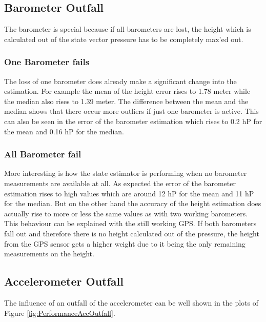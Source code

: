 \subsection{Barometer Outfall}
The barometer is special because if all barometers are lost,
the height which is calculated out of the state vector pressure has to be completely max'ed out.

\subsubsection{One Barometer fails}
The loss of one barometer does already make a significant change into the estimation.
For example the mean of the height error rises to 1.78 meter while the median also rises to 1.39 meter.
The difference between the mean and the median shows that there occur more outliers if just one barometer is active.
This can also be seen in the error of the barometer estimation which rises to 0.2 hP for the mean and 0.16 hP for the median.

\subsubsection{All Barometer fail}
More interesting is how the state estimator is performing when no barometer measurements are available at all.
As expected the error of the barometer estimation rises to high values which are around 12 hP for the mean and 11 hP for the median.
But on the other hand the accuracy of the height estimation does actually rise to more or less the same values as with two working barometers.
This behaviour can be explained with the still working GPS.
If both barometers fall out and therefore there is no height calculated out of the pressure, the height from the
GPS sensor gets a higher weight due to it being the only remaining measurements on the height.

\newpage
\subsection{Accelerometer Outfall}
The influence of an outfall of the accelerometer can be well shown in the plots of Figure \ref{fig:PerformanceAccOutfall}.

